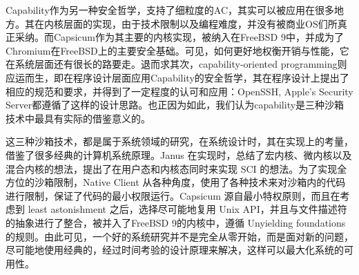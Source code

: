 
Capability作为另一种安全哲学，支持了细粒度的AC，其实可以被应用在很多地方。其在内核层面的实现，由于技术限制以及编程难度，并没有被商业OS们所真正采纳。而Capsicum作为其主要的内核实现，被纳入在FreeBSD 9中，并成为了Chromium在FreeBSD上的主要安全基础。可见，如何更好地权衡开销与性能，它在系统层面还有很长的路要走。退而求其次，capability-oriented programming则应运而生，即在程序设计层面应用Capability的安全哲学，其在程序设计上提出了相应的规范和要求，并得到了一定程度的认可和应用：OpenSSH, Apple's Security Server都遵循了这样的设计思路。也正因为如此，我们认为capability是三种沙箱技术中最具有实际的借鉴意义的。

这三种沙箱技术，都是属于系统领域的研究，在系统设计时，其在实现上的考量，借鉴了很多经典的计算机系统原理。Janus 在实现时，总结了宏内核、微内核以及混合内核的想法，提出了在用户态和内核态同时来实现 SCI 的想法。为了实现全方位的沙箱限制，Native Client 从各种角度，使用了各种技术来对沙箱内的代码进行限制，保证了代码的最小权限运行。Capsicum 源自最小特权原则，而且在考虑到 least astonishment 之后，选择尽可能地复用 Unix API，并且与文件描述符的抽象进行了整合，被并入了FreeBSD 9的内核中，遵循 Unyielding foundations 的规则。由此可见，一个好的系统研究并不是完全从零开始，而是面对新的问题，尽可能地使用经典的，经过时间考验的设计原理来解决，这样可以最大化系统的可用性。
